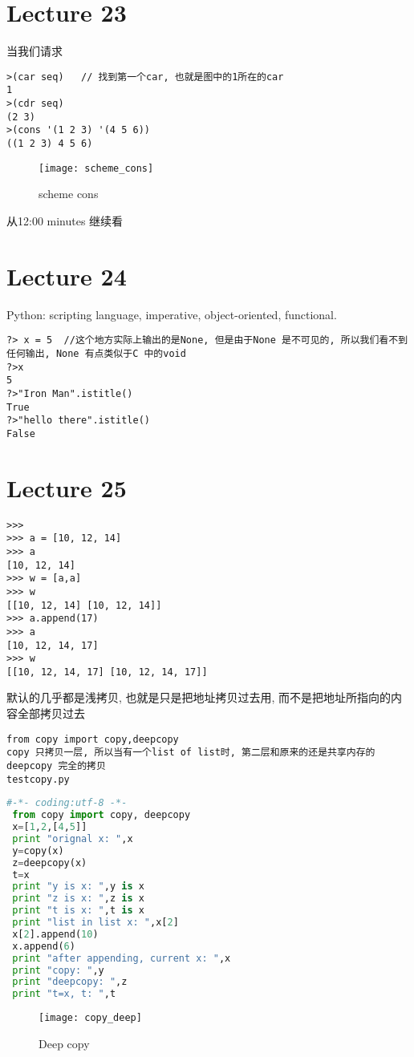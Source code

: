 \documentclass{article}
\begin{document}
\section{Lecture 23}
当我们请求
\begin{verbatim}
>(car seq)   // 找到第一个car, 也就是图中的1所在的car
1
>(cdr seq)
(2 3)
>(cons '(1 2 3) '(4 5 6))
((1 2 3) 4 5 6)
\end{verbatim}
\begin{figure}[htbp]
	\centering
	\texttt{[image: scheme\_cons]}\\
	\caption{scheme cons}\label{fig.scheme.cons}
\end{figure}

从12:00 minutes 继续看

\section{Lecture 24}
Python:
scripting language,
imperative,
object-oriented,
functional.

\begin{verbatim}
?> x = 5  //这个地方实际上输出的是None, 但是由于None 是不可见的, 所以我们看不到任何输出, None 有点类似于C 中的void
?>x
5
?>"Iron Man".istitle()
True
?>"hello there".istitle()
False
\end{verbatim}

\section{Lecture 25}
\begin{verbatim}
>>>
>>> a = [10, 12, 14]
>>> a
[10, 12, 14]
>>> w = [a,a]
>>> w
[[10, 12, 14] [10, 12, 14]]
>>> a.append(17)
>>> a
[10, 12, 14, 17]
>>> w
[[10, 12, 14, 17] [10, 12, 14, 17]]
\end{verbatim}
默认的几乎都是浅拷贝, 也就是只是把地址拷贝过去用, 而不是把地址所指向的内容全部拷贝过去

\begin{verbatim}
from copy import copy,deepcopy
copy 只拷贝一层, 所以当有一个list of list时, 第二层和原来的还是共享内存的
deepcopy 完全的拷贝
testcopy.py
\end{verbatim}

\begin{lstlisting}[language = Python]
#-*- coding:utf-8 -*-
 from copy import copy, deepcopy
 x=[1,2,[4,5]]
 print "orignal x: ",x
 y=copy(x)
 z=deepcopy(x)
 t=x
 print "y is x: ",y is x
 print "z is x: ",z is x
 print "t is x: ",t is x
 print "list in list x: ",x[2]
 x[2].append(10)
 x.append(6)
 print "after appending, current x: ",x
 print "copy: ",y
 print "deepcopy: ",z
 print "t=x, t: ",t
 \end{lstlisting}
\begin{figure}[htbp]
	\centering
	\texttt{[image: copy\_deep]}\\
	\caption{Deep copy}\label{fig.copy.deep}
\end{figure}
\end{document}
